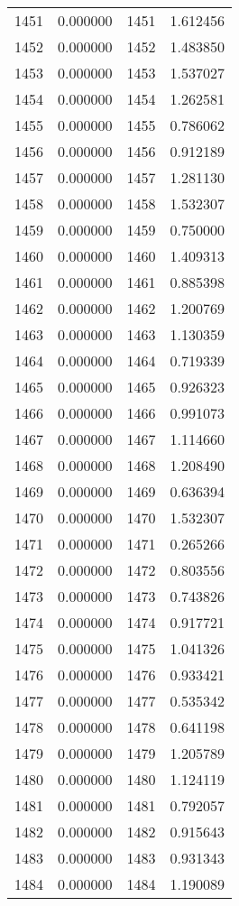 \documentclass[12pt]{article}
\begin{document}
\begin{longtable}{@{}cccc@{}}
1451 & 0.000000 & 1451 & 1.612456 \\
1452 & 0.000000 & 1452 & 1.483850 \\
1453 & 0.000000 & 1453 & 1.537027 \\
1454 & 0.000000 & 1454 & 1.262581 \\
1455 & 0.000000 & 1455 & 0.786062 \\
1456 & 0.000000 & 1456 & 0.912189 \\
1457 & 0.000000 & 1457 & 1.281130 \\
1458 & 0.000000 & 1458 & 1.532307 \\
1459 & 0.000000 & 1459 & 0.750000 \\
1460 & 0.000000 & 1460 & 1.409313 \\
1461 & 0.000000 & 1461 & 0.885398 \\
1462 & 0.000000 & 1462 & 1.200769 \\
1463 & 0.000000 & 1463 & 1.130359 \\
1464 & 0.000000 & 1464 & 0.719339 \\
1465 & 0.000000 & 1465 & 0.926323 \\
1466 & 0.000000 & 1466 & 0.991073 \\
1467 & 0.000000 & 1467 & 1.114660 \\
1468 & 0.000000 & 1468 & 1.208490 \\
1469 & 0.000000 & 1469 & 0.636394 \\
1470 & 0.000000 & 1470 & 1.532307 \\
1471 & 0.000000 & 1471 & 0.265266 \\
1472 & 0.000000 & 1472 & 0.803556 \\
1473 & 0.000000 & 1473 & 0.743826 \\
1474 & 0.000000 & 1474 & 0.917721 \\
1475 & 0.000000 & 1475 & 1.041326 \\
1476 & 0.000000 & 1476 & 0.933421 \\
1477 & 0.000000 & 1477 & 0.535342 \\
1478 & 0.000000 & 1478 & 0.641198 \\
1479 & 0.000000 & 1479 & 1.205789 \\
1480 & 0.000000 & 1480 & 1.124119 \\
1481 & 0.000000 & 1481 & 0.792057 \\
1482 & 0.000000 & 1482 & 0.915643 \\
1483 & 0.000000 & 1483 & 0.931343 \\
1484 & 0.000000 & 1484 & 1.190089 \\

\end{longtable}
\end{document}
